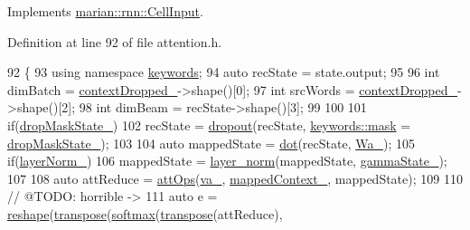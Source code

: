 Implements \hyperlink{classmarian_1_1rnn_1_1CellInput_afecfcb2679941468cf4dbab6dba4617e}{marian\+::rnn\+::\+Cell\+Input}.



Definition at line 92 of file attention.\+h.


\begin{DoxyCode}
92                           \{
93     \textcolor{keyword}{using namespace }\hyperlink{namespacekeywords}{keywords};
94     \textcolor{keyword}{auto} recState = state.output;
95 
96     \textcolor{keywordtype}{int} dimBatch = \hyperlink{classmarian_1_1rnn_1_1GlobalAttention_af2d8e79f08edb6846b5e645928ddf60d}{contextDropped\_}->shape()[0];
97     \textcolor{keywordtype}{int} srcWords = \hyperlink{classmarian_1_1rnn_1_1GlobalAttention_af2d8e79f08edb6846b5e645928ddf60d}{contextDropped\_}->shape()[2];
98     \textcolor{keywordtype}{int} dimBeam = recState->shape()[3];
99 
100 
101     \textcolor{keywordflow}{if}(\hyperlink{classmarian_1_1rnn_1_1GlobalAttention_a0278e2cbabd73c51991d391e8d736aac}{dropMaskState\_})
102       recState = \hyperlink{namespacemarian_a268400392f22176821c7c4a36733b178}{dropout}(recState, \hyperlink{namespacemarian_1_1keywords_a201bea6bea8108889b63081132cc3cd7}{keywords::mask} = 
      \hyperlink{classmarian_1_1rnn_1_1GlobalAttention_a0278e2cbabd73c51991d391e8d736aac}{dropMaskState\_});
103 
104     \textcolor{keyword}{auto} mappedState = \hyperlink{namespacemarian_ad7fbf1ba8e2e04ffdc7d5e4841b5e691}{dot}(recState, \hyperlink{classmarian_1_1rnn_1_1GlobalAttention_a084709a27aef6e0309431502ab74f0c5}{Wa\_});
105     \textcolor{keywordflow}{if}(\hyperlink{classmarian_1_1rnn_1_1GlobalAttention_a30abb68765a3b8d6a1b88f471b9f3c6b}{layerNorm\_})
106       mappedState = \hyperlink{namespacemarian_a6202278a9da8ca8a281a6a96e75082f6}{layer\_norm}(mappedState, \hyperlink{classmarian_1_1rnn_1_1GlobalAttention_aa934fc65efbfb2b16427f02c135ccb69}{gammaState\_});
107 
108     \textcolor{keyword}{auto} attReduce = \hyperlink{namespacemarian_1_1rnn_a7dd35a8b53e7515e0d3bd91c7be32fe3}{attOps}(\hyperlink{classmarian_1_1rnn_1_1GlobalAttention_abe451398726539e115ff20ed79be82cd}{va\_}, \hyperlink{classmarian_1_1rnn_1_1GlobalAttention_aef1ab40f3c2a411f7734cd07388c0a23}{mappedContext\_}, mappedState);
109 
110     \textcolor{comment}{// @TODO: horrible ->}
111     \textcolor{keyword}{auto} e = \hyperlink{namespacemarian_acd984f43188d0ae23c2a6ef13ae5293f}{reshape}(\hyperlink{namespacemarian_a00669690ef16ce9b1bde5ee9d1b77ac6}{transpose}(\hyperlink{namespacemarian_a3c08107d509be52ee2c17eb6d54c7ebc}{softmax}(\hyperlink{namespacemarian_a00669690ef16ce9b1bde5ee9d1b77ac6}{transpose}(attReduce), 

\end{DoxyCode}
